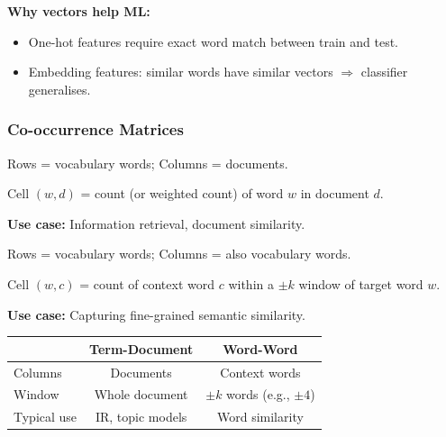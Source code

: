 \textbf{Why vectors help ML:}
\begin{itemize}
  \item One-hot features require exact word match between train and test.
  \item Embedding features: similar words have similar vectors $\Rightarrow$ classifier generalises.
\end{itemize}

\separator

\subsubsection{Co-occurrence Matrices}

\begin{defbox}
Rows = vocabulary words; Columns = documents.

Cell $(w, d)$ = count (or weighted count) of word $w$ in document $d$.

\textbf{Use case:} Information retrieval, document similarity.
\end{defbox}

\begin{defbox}
Rows = vocabulary words; Columns = also vocabulary words.

Cell $(w, c)$ = count of context word $c$ within a $\pm k$ window of target word $w$.

\textbf{Use case:} Capturing fine-grained semantic similarity.
\end{defbox}

\begin{center}
\renewcommand{\arraystretch}{1.2}
\begin{tabular}{@{} l c c @{}}
\toprule
 & \textbf{Term-Document} & \textbf{Word-Word} \\
\midrule
Columns & Documents & Context words \\
Window & Whole document & $\pm k$ words (e.g., $\pm 4$) \\
Typical use & IR, topic models & Word similarity \\
\bottomrule
\end{tabular}
\end{center}

